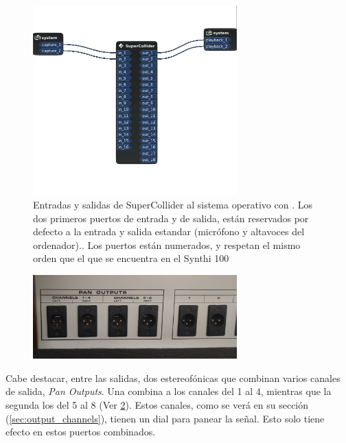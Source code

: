 \begin{figure}
	\centering
	\includegraphics[width=0.7\textwidth]{images/entradas_salidas}
	\caption[Entradas y salidas al sistema]{Entradas y salidas de SuperCollider al sistema operativo con \appName. Los dos primeros puertos de entrada y de salida, están reservados por defecto a la entrada y salida estandar (micrófono y altavoces del ordenador).. Los puertos están numerados, y respetan el mismo orden que el que se encuentra en el Synthi 100}
	\label{fig:entradas_salidas}
\end{figure}

\begin{figure}
	\centering
	\includegraphics[width=0.7\textwidth]{images/outputs_xlr}
	\caption[]{}
	\label{fig:outputs_xlr}
\end{figure}

Cabe destacar, entre las salidas, dos estereofónicas que combinan varios canales de salida, \textit{Pan Outputs}. Una combina a los canales del 1 al 4, mientras que la segunda los del 5 al 8 (Ver \ref{fig:outputs_xlr}). Estos canales, como se verá en su sección (\ref*{sec:output_channels}), tienen un dial para panear la señal. Esto solo tiene efecto en estos puertos combinados.